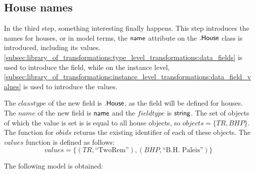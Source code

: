 \subsection{House names}
\label{subsec:application:building_the_model:house_names}

In the third step, something interesting finally happens. This step introduces the names for houses, or in model terms, the $\mathsf{name}$ attribute on the $.\mathsf{House}$ class is introduced, including its values. \cref{subsec:library_of_transformations:type_level_transformations:data_fields} is used to introduce the field, while on the instance level, \cref{subsec:library_of_transformations:instance_level_transformations:data_field_values} is used to introduce the values.

The $classtype$ of the new field is $.\mathsf{House}$, as the field will be defined for houses. The $name$ of the new field is $\mathsf{name}$ and the $fieldtype$ is $\mathsf{string}$. The set of objects of which the value is set is is equal to all house objects, so $objects = \{TR, BHP\}$. The function for $obids$ returns the existing identifier of each of these objects. The $values$ function is defined as follows:
\begin{equation*}
    values = \{(TR, \text{``TwoRem''}), (BHP, \text{``B.H. Paleis''})\}
\end{equation*}

The following model is obtained:


